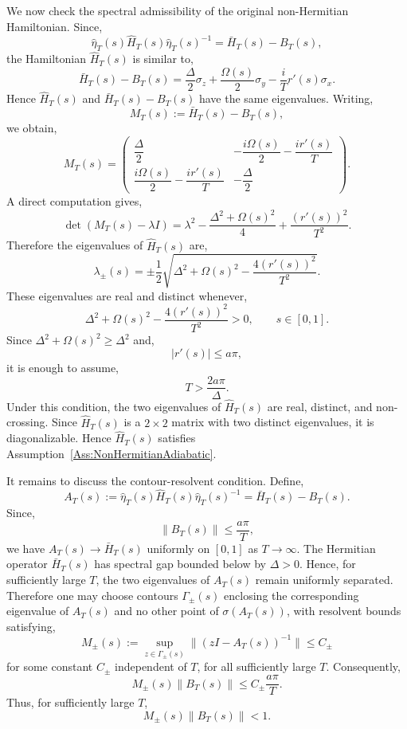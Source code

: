 \documentclass[pdflatex,sn-mathphys-num]{sn-jnl}
\theoremstyle{thmstyleone}
\theoremstyle{thmstyletwo}
\theoremstyle{thmstylethree}
\begin{document}
We now check the spectral admissibility of the original non-Hermitian
Hamiltonian. Since,
\[
\hat\eta_T(s)\hat H_T(s)\hat\eta_T(s)^{-1}
=
\bar H_T(s)-B_T(s),
\]
the Hamiltonian \(\hat H_T(s)\) is similar to,
\[
\bar H_T(s)-B_T(s)
=
\frac{\Delta}{2}\sigma_z
+
\frac{\Omega(s)}{2}\sigma_y
-
\frac{i}{T}r'(s)\sigma_x.
\]
Hence \(\hat H_T(s)\) and \(\bar H_T(s)-B_T(s)\) have the same eigenvalues.
Writing,
\[
M_T(s):=\bar H_T(s)-B_T(s),
\]
we obtain,
\[
M_T(s)
=
\begin{pmatrix}
\dfrac{\Delta}{2}
&
-\dfrac{i\Omega(s)}{2}-\dfrac{i r'(s)}{T}
\\[6pt]
\dfrac{i\Omega(s)}{2}-\dfrac{i r'(s)}{T}
&
-\dfrac{\Delta}{2}
\end{pmatrix}.
\]
A direct computation gives,
\[
\det(M_T(s)-\lambda I)
=
\lambda^2
-
\frac{\Delta^2+\Omega(s)^2}{4}
+
\frac{(r'(s))^2}{T^2}.
\]
Therefore the eigenvalues of \(\hat H_T(s)\) are,
\[
\lambda_{\pm}(s)
=
\pm
\frac{1}{2}
\sqrt{
\Delta^2+\Omega(s)^2-\frac{4(r'(s))^2}{T^2}
}.
\]
These eigenvalues are real and distinct whenever,
\[
\Delta^2+\Omega(s)^2-\frac{4(r'(s))^2}{T^2}>0,
\qquad s\in[0,1].
\]
Since \(\Delta^2+\Omega(s)^2\ge\Delta^2\) and,
\[
|r'(s)|\le a\pi,
\]
it is enough to assume,
\[
T>\frac{2a\pi}{\Delta}.
\]
Under this condition, the two eigenvalues of \(\hat H_T(s)\) are real,
distinct, and non-crossing. Since \(\hat H_T(s)\) is a \(2\times2\) matrix with
two distinct eigenvalues, it is diagonalizable. Hence \(\hat H_T(s)\) satisfies
Assumption~\ref{Ass:NonHermitianAdiabatic}.

It remains to discuss the contour-resolvent condition. Define,
\[
A_T(s):=\hat\eta_T(s)\hat H_T(s)\hat\eta_T(s)^{-1}
=
\bar H_T(s)-B_T(s).
\]
Since,
\[
\|B_T(s)\|\le \frac{a\pi}{T},
\]
we have \(A_T(s)\to \bar H_T(s)\) uniformly on \([0,1]\) as \(T\to\infty\).
The Hermitian operator \(\bar H_T(s)\) has spectral gap bounded below by
\(\Delta>0\). Hence, for sufficiently large \(T\), the two eigenvalues
of \(A_T(s)\) remain uniformly separated. Therefore one may choose contours
\(\Gamma_{\pm}(s)\) enclosing the corresponding eigenvalue of \(A_T(s)\) and no
other point of \(\sigma(A_T(s))\), with resolvent bounds satisfying,
\[
M_{\pm}(s)
:=
\sup_{z\in\Gamma_{\pm}(s)}
\|(zI-A_T(s))^{-1}\|
\le C_{\pm}
\]
for some constant \(C_{\pm}\) independent of \(T\), for all sufficiently large
\(T\). Consequently,
\[
M_{\pm}(s)\|B_T(s)\|
\le
C_{\pm}\frac{a\pi}{T}.
\]
Thus, for sufficiently large \(T\),
\[
M_{\pm}(s)\|B_T(s)\|<1.
\]
\end{document}
